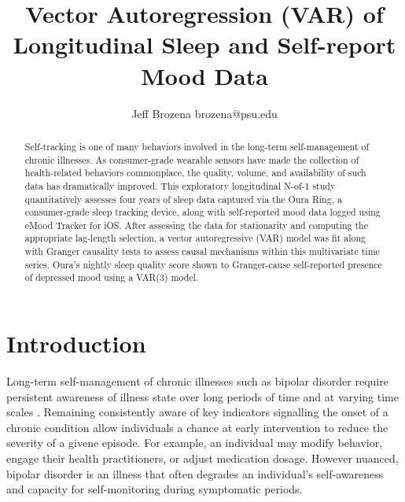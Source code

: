 \documentclass{article}
\begin{document}
\title{Vector Autoregression (VAR) of Longitudinal Sleep and Self-report Mood Data}

\author{\name Jeff Brozena \email brozena@psu.edu}
\maketitle

\begin{abstract}%

  Self-tracking is one of many behaviors involved in the long-term
  self-management of chronic illnesses. As consumer-grade wearable sensors have
  made the collection of health-related behaviors commonplace, the quality,
  volume, and availability of such data has dramatically improved. This
  exploratory longitudinal N-of-1 study quantitatively assesses four years of
  sleep data captured via the Oura Ring, a consumer-grade sleep tracking device,
  along with self-reported mood data logged using eMood Tracker for iOS. After
  assessing the data for stationarity and computing the appropriate lag-length
  selection, a vector autoregressive (VAR) model was fit along with Granger
  causality tests to assess causal mechanisms within this multivariate time
  series. Oura's nightly sleep quality score shown to Granger-cause
  self-reported presence of depressed mood using a VAR(3) model. 

\end{abstract}

\hypertarget{introduction}{%
\section{Introduction}\label{introduction}}

Long-term self-management of chronic illnesses such as bipolar disorder require
persistent awareness of illness state over long periods of time and at varying
time scales \citep{murnane2016SelfmonitoringPracticesAttitudes,
morton2018TakingBackReins, majid2022ExploringSelftrackingPractices}. Remaining
consistently aware of key indicators signalling the onset of a chronic condition
allow individuals a chance at early intervention to reduce the severity of a
givene episode. For example, an individual may modify behavior, engage their
health practitioners, or adjust medication dosage. However nuanced, bipolar
disorder is an illness that often degrades an individual's self-awareness and
capacity for self-monitoring during symptomatic periods.
\end{document}
